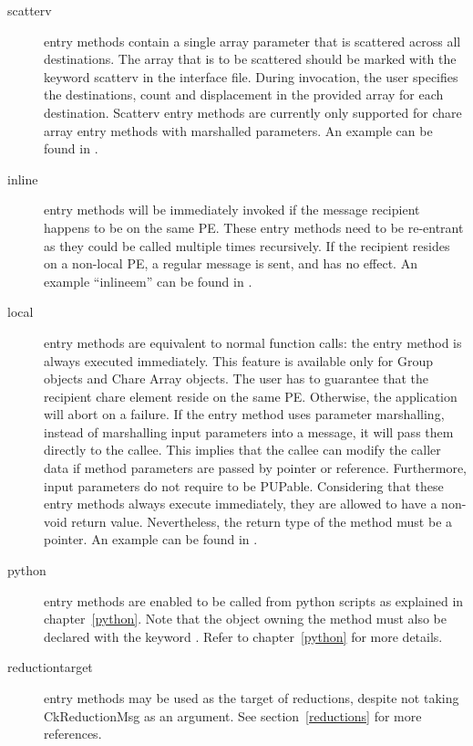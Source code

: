 \begin{description}
\item[scatterv] entry methods contain a single array parameter 
that is scattered across all destinations. The array that is to be scattered 
should be marked with the keyword scatterv in the interface file. During 
invocation, the user specifies the destinations, count and displacement in the 
provided array for each destination. Scatterv entry methods are currently only 
supported for chare array entry methods with marshalled parameters. An example
can be found in .


\item[inline] entry methods will be immediately invoked if the
message recipient happens to be on the same PE. These entry methods need to be
re-entrant as they could be called multiple times recursively. If the recipient
resides on a non-local PE, a regular message is sent, and  has no
effect. An example ``inlineem'' can be found in .

\item[local] entry methods are equivalent to normal function
calls: the entry method is always executed immediately. This feature is
available only for Group objects and Chare Array objects. The user has to
guarantee that the recipient chare element reside on the same PE. Otherwise,
the application will abort on a failure. If the  entry method uses
parameter marshalling, instead of marshalling input parameters into a message,
it will pass them directly to the callee. This implies that the callee can
modify the caller data if method parameters are passed by pointer or reference.
Furthermore, input parameters do not require to be PUPable. Considering that
these entry methods always execute immediately, they are allowed to have a
non-void return value. Nevertheless, the return type of the method must be a
pointer. An example can be found in .

\item[python] entry methods are enabled to be
called from python scripts as explained in chapter~\ref{python}. Note that the object owning the method must also be declared with the
keyword . Refer to chapter~\ref{python} for more details.

\item[reductiontarget] entry methods may be used as the
target of reductions, despite not taking CkReductionMsg as an argument.
See section~\ref{reductions} for more references.

\end{description}
